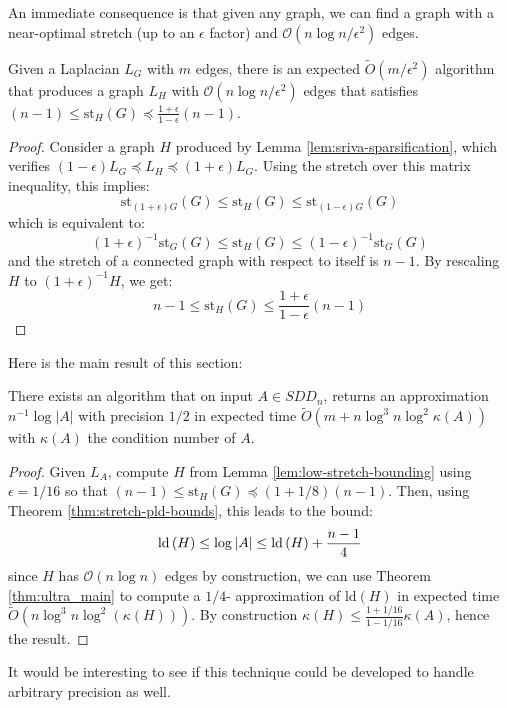 An immediate consequence is that given any graph, we can find a graph
with a near-optimal stretch (up to an $\epsilon$ factor) and $\mathcal{O}\left(n\log n/\epsilon^{2}\right)$
edges. 
\begin{lemma}
\label{lem:low-stretch-bounding}Given a Laplacian $L_{G}$ with $m$
edges, there is an expected $\tilde{O}\left(m/\epsilon^{2}\right)$
algorithm that produces a graph $L_{H}$ with $\mathcal{O}\left(n\log n/\epsilon^{2}\right)$
edges that satisfies $\left(n-1\right)\leq\text{st}_{H}\left(G\right)\preceq\frac{1+\epsilon}{1-\epsilon}\left(n-1\right)$.\end{lemma}
\begin{proof}
Consider a graph $H$ produced by Lemma \ref{lem:sriva-sparsification},
which verifies $\left(1-\epsilon\right)L_{G}\preceq L_{H}\preceq\left(1+\epsilon\right)L_{G}$.
Using the stretch over this matrix inequality, this implies: 
\[
\text{st}_{\left(1+\epsilon\right)G}\left(G\right)\leq\text{st}_{H}\left(G\right)\leq\text{st}_{\left(1-\epsilon\right)G}\left(G\right)
\]
which is equivalent to: 
\[
\left(1+\epsilon\right)^{-1}\text{st}_{G}\left(G\right)\leq\text{st}_{H}\left(G\right)\leq\left(1-\epsilon\right)^{-1}\text{st}_{G}\left(G\right)
\]
and the stretch of a connected graph with respect to itself is $n-1$.
By rescaling $H$ to $\left(1+\epsilon\right)^{-1}H$, we get: 
\[
n-1\leq\text{st}_{H}\left(G\right)\leq\frac{1+\epsilon}{1-\epsilon}\left(n-1\right)
\]

\end{proof}

Here is the main result of this section: 
\begin{proposition}
There exists an algorithm that on input $A\in SDD_{n}$, returns an
approximation $n^{-1}\log\left|A\right|$ with precision $1/2$ in
expected time \linebreak $\tilde{O}\left(m+n\log^{3}n\log^{2}\kappa(A)\right)$
with $\kappa(A)$ the condition number of $A$.\end{proposition}
\begin{proof}
Given $L_{A}$, compute $H$ from Lemma \ref{lem:low-stretch-bounding}
using $\epsilon=1/16$ so that $\left(n-1\right)\leq\text{st}_{H}\left(G\right)\preceq\left(1+1/8\right)\left(n-1\right)$.
Then, using Theorem \ref{thm:stretch-pld-bounds}, this leads to the
bound: 
\[
\text{\text{ld}}\left(H\right)\leq\log\left|A\right|\leq\text{ld}\left(H\right)+\frac{n-1}{4}
\]
since $H$ has $\mathcal{O}\left(n\log n\right)$ edges by construction,
we can use Theorem \ref{thm:ultra_main} to compute a $1/4$- approximation
of $\text{ld}\left(H\right)$ in expected time $\tilde{O}\left(n\log^{3}n\log^{2}\left(\kappa(H)\right)\right)$.
By construction $\kappa(H)\leq\frac{1+1/16}{1-1/16}\kappa(A)$, hence
the result. 
\end{proof}

It would be interesting to see if this technique could be developed
to handle arbitrary precision as well. 
